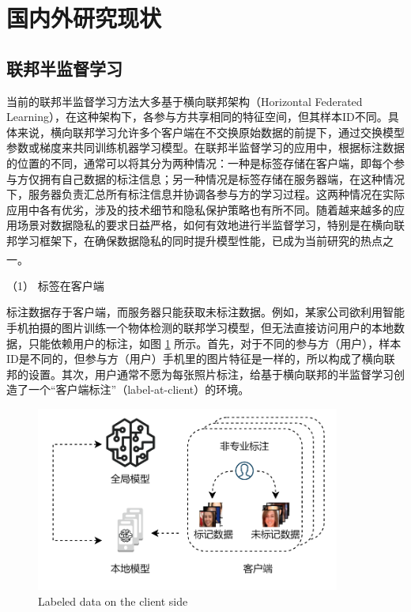 \section{国内外研究现状}
\subsection{联邦半监督学习}
当前的联邦半监督学习方法大多基于横向联邦架构（Horizontal Federated Learning），在这种架构下，各参与方共享相同的特征空间，但其样本ID不同。具体来说，横向联邦学习允许多个客户端在不交换原始数据的前提下，通过交换模型参数或梯度来共同训练机器学习模型。在联邦半监督学习的应用中，根据标注数据的位置的不同，通常可以将其分为两种情况：一种是标签存储在客户端，即每个参与方仅拥有自己数据的标注信息；另一种情况是标签存储在服务器端，在这种情况下，服务器负责汇总所有标注信息并协调各参与方的学习过程。这两种情况在实际应用中各有优劣，涉及的技术细节和隐私保护策略也有所不同。随着越来越多的应用场景对数据隐私的要求日益严格，如何有效地进行半监督学习，特别是在横向联邦学习框架下，在确保数据隐私的同时提升模型性能，已成为当前研究的热点之一\textsuperscript{\cite{jin2023federated}}。

（1） 标签在客户端

标注数据存于客户端，而服务器只能获取未标注数据。例如，某家公司欲利用智能手机拍摄的图片训练一个物体检测的联邦学习模型，但无法直接访问用户的本地数据，只能依赖用户的标注，如图 \ref{LabelAtClient} 所示。首先，对于不同的参与方（用户），样本ID是不同的，但参与方（用户）手机里的图片特征是一样的，所以构成了横向联邦的设置。其次，用户通常不愿为每张照片标注，给基于横向联邦的半监督学习创造了一个“客户端标注”（label-at-client）的环境。

\vspace{-0.1cm}
\begin{figure}[h]
	\centering
	\includegraphics[width=10cm]{chapters/imgs/LabelAtClient}
	{\wuhao Labeled data on the client side}
	\label{LabelAtClient}
\end{figure}
\vspace{-0.35cm}

